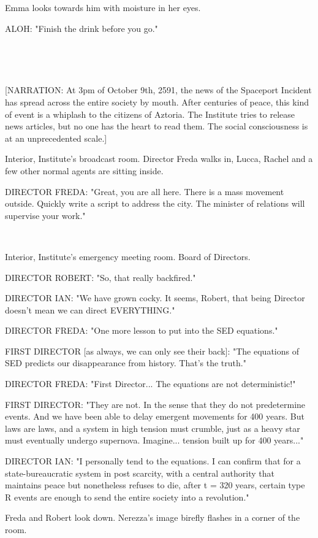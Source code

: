 \documentclass[11pt]{article}
\begin{document}
Emma looks towards him with moisture in her eyes.

ALOH: "Finish the drink before you go."

\ 

\ 

[NARRATION: At 3pm of October 9th, 2591, the news of the Spaceport Incident has spread across the entire society by mouth.
After centuries of peace, this kind of event is a whiplash to the citizens of Aztoria.
The Institute tries to release news articles, but no one has the heart to read them.
The social consciousness is at an unprecedented scale.]

Interior, Institute's broadcast room.
Director Freda walks in, Lucca, Rachel and a few other normal agents are sitting inside.

DIRECTOR FREDA: "Great, you are all here.
There is a mass movement outside.
Quickly write a script to address the city. 
The minister of relations will supervise your work."

\ 

Interior, Institute's emergency meeting room. 
Board of Directors. 

DIRECTOR ROBERT: "So, that really backfired."

DIRECTOR IAN: "We have grown cocky.
It seems, Robert, that being Director doesn't mean we can direct EVERYTHING."

DIRECTOR FREDA: "One more lesson to put into the SED equations."

FIRST DIRECTOR [as always, we can only see their back]: "The equations of SED predicts our disappearance from history.
That's the truth."

DIRECTOR FREDA: "First Director... The equations are not deterministic!"

FIRST DIRECTOR: "They are not. In the sense that they do not predetermine events.
And we have been able to delay emergent movements for 400 years.
But laws are laws, and a system in high tension must crumble, just as a heavy star must eventually undergo supernova.
Imagine... tension built up for 400 years..."

DIRECTOR IAN: "I personally tend to the equations. 
I can confirm that for a state-bureaucratic system in post scarcity, with a central authority that maintains peace but nonetheless refuses to die, after t = 320 years, certain type R events are enough to send the entire society into a revolution."

Freda and Robert look down. 
Nerezza's image birefly flashes in a corner of the room.
\end{document}
